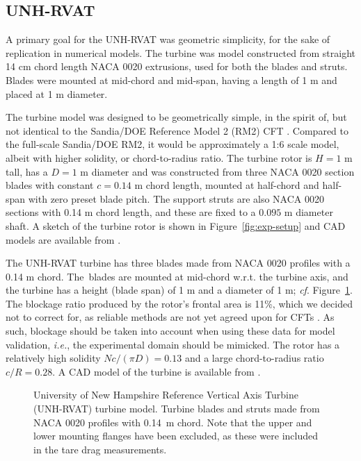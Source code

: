 \subsection{UNH-RVAT}

A primary goal for the UNH-RVAT was geometric simplicity, for the sake of
replication in numerical models. The turbine was model constructed from straight
14 cm chord length NACA 0020 extrusions, used for both the blades and struts.
Blades were mounted at mid-chord and mid-span, having a length of 1 m and placed
at 1 m diameter.


The turbine model was designed to be geometrically simple, in the spirit of, but
not identical to the Sandia/DOE Reference Model 2 (RM2) CFT \cite{Neary2013,
    Barone2011}. Compared to the full-scale Sandia/DOE RM2, it would be
approximately a 1:6 scale model, albeit with higher solidity, or chord-to-radius
ratio. The turbine rotor is $H=1$ m tall, has a $D=1$ m diameter and was
constructed from three NACA 0020 section blades with constant $c=0.14$ m chord
length, mounted at half-chord and half-span with zero preset blade pitch. The
support struts are also NACA 0020 sections with 0.14 m chord length, and these
are fixed to a $0.095$ m diameter shaft. A sketch of the turbine rotor is shown
in Figure~\ref{fig:exp-setup} and CAD models are available from
\cite{Bachant2014-RVAT-CAD}.


The UNH-RVAT turbine has three blades made from NACA 0020 profiles with a 0.14 m
chord. The~blades are mounted at mid-chord w.r.t. the turbine axis, and the
turbine has a height (blade span) of 1 m and a diameter of 1 m; \textit{cf}.
Figure~\ref{fig:turbine}. The blockage ratio produced by the rotor's frontal
area is 11\%, which we decided not to correct for, as reliable methods are not
yet agreed upon for CFTs \cite{Cavagnaro2014}. As such, blockage should be taken
into account when using these data for model validation, \emph{i.e.}, the
experimental domain should be mimicked. The rotor has a relatively high solidity
$Nc/(\pi D) = 0.13$ and a large chord-to-radius ratio $c/R = 0.28$. A CAD model
of the turbine is available from \cite{Bachant2014-RVAT-CAD}.

\begin{figure}[ht]
    \centering
    
    
    \caption{University of New Hampshire Reference Vertical Axis Turbine (UNH-RVAT)
        turbine model. Turbine blades and struts made from NACA 0020 profiles with
        0.14~m chord. Note that the upper and lower mounting flanges have been excluded,
        as these were included in the tare drag measurements.}
    
    \label{fig:turbine}
\end{figure}


